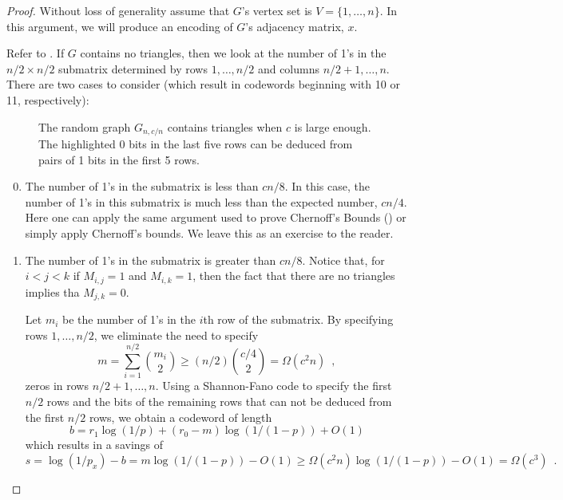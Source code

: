 \documentclass{patmorin}
\begin{document}
\begin{proof}
   Without loss of generality assume that $G$'s vertex set is
   $V=\{1,\ldots,n\}$.  In this argument, we will produce an encoding
   of $G$'s adjacency matrix, $x$.

   Refer to .  If $G$ contains no triangles, then we
   look at the number of 1's in the $n/2\times n/2$ submatrix
   determined by rows $1,\ldots,n/2$ and columns $n/2+1,\ldots,n$.
   There are two cases to consider (which result in codewords
   beginning with 10 or 11, respectively):

   \begin{figure}
     \caption{The random graph $G_{n,c/n}$ contains triangles when $c$ is
       large enough.  The highlighted 0 bits in the last five rows can
       be deduced from pairs of 1 bits in the first 5 rows.}
   \end{figure}

   \begin{enumerate}\setcounter{enumi}{-1}
     \item The number of 1's in the submatrix is less than $cn/8$.
      In this case, the number of 1's in this submatrix is much less than
      the expected number, $cn/4$.  Here one can apply the same argument
      used to prove Chernoff's Bounds () or simply
      apply Chernoff's bounds. We leave this as an exercise to the reader.

     \item The number of 1's in the submatrix is greater than $cn/8$.
      Notice that, for $i<j<k$ if $M_{i,j}=1$ and $M_{i,k}=1$, then the
      fact that there are no triangles implies tha $M_{j,k}=0$.

      Let $m_i$ be the number of 1's in the $i$th row of the submatrix.
      By specifying rows $1,\ldots,n/2$, we eliminate the need to specify
      \[
          m = \sum_{i=1}^{n/2}\binom{m_i}{2} \ge (n/2)\binom{c/4}{2} = \Omega(c^2n) \enspace ,
      \]
      zeros in rows $n/2+1,\ldots,n$.
      Using a Shannon-Fano code to specify the first $n/2$ rows and the bits of the remaining rows that can not be deduced from the first $n/2$ rows, we obtain a codeword of length 
      \[
          b = r_1\log(1/p) + (r_0-m)\log(1/(1-p))  + O(1)
      \]
      which results in a savings of
      \[
          s = \log(1/p_x) - b = m\log(1/(1-p)) -O(1) \ge \Omega(c^2n)\log(1/(1-p)) - O(1) = \Omega(c^3) \enspace .
      \]
   \end{enumerate}
\end{proof}
\end{document}
